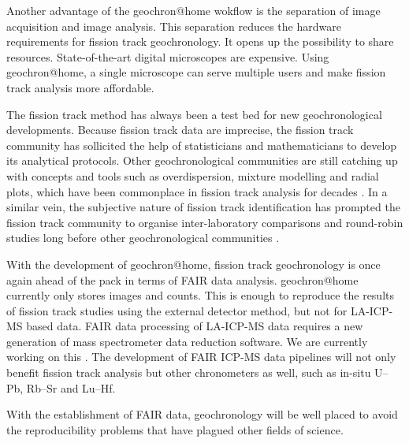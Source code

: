 \documentclass[gchron, manuscript]{copernicus}
\begin{document}
Another advantage of the geochron@home wokflow is the separation of
image acquisition and image analysis. This separation reduces the
hardware requirements for fission track geochronology. It opens up the
possibility to share resources. State-of-the-art digital microscopes
are expensive. Using geochron@home, a single microscope can serve
multiple users and make fission track analysis more
affordable.\medskip

The fission track method has always been a test bed for new
geochronological developments.  Because fission track data are
imprecise, the fission track community has sollicited the help of
statisticians and mathematicians to develop its analytical protocols.
Other geochronological communities are still catching up with concepts
and tools such as overdispersion, mixture modelling and radial plots,
which have been commonplace in fission track analysis for decades
\citep{vermeesch2019b}. In a similar vein, the subjective nature of
fission track identification has prompted the fission track community
to organise inter-laboratory comparisons and round-robin studies long
before other geochronological communities
\citep{miller1985,tamer2025}.\medskip

With the development of geochron@home, fission track geochronology is
once again ahead of the pack in terms of FAIR data analysis.
geochron@home currently only stores images and counts. This is enough
to reproduce the results of fission track studies using the external
detector method, but not for LA-ICP-MS based data. FAIR data
processing of LA-ICP-MS data requires a new generation of mass
spectrometer data reduction software. We are currently working on this
\citep{vermeesch2025b}. The development of FAIR ICP-MS data pipelines
will not only benefit fission track analysis but other chronometers as
well, such as in-situ U--Pb, Rb--Sr and Lu--Hf.\medskip

With the establishment of FAIR data, geochronology will be well placed
to avoid the reproducibility problems that have plagued other fields
of science.

\end{document}
